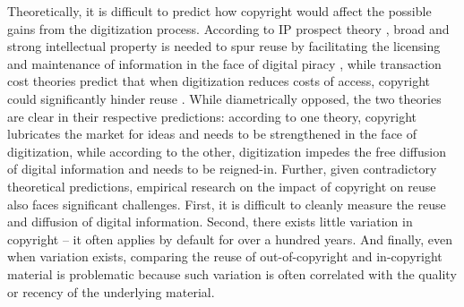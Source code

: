 \documentclass[11pt]{article}
\begin{document}
Theoretically, it is difficult to predict how copyright would affect the possible gains from the digitization process. According to IP prospect theory \citep{kitch_nature_1977}, broad and strong intellectual property is needed to spur reuse by facilitating the licensing and maintenance of information \citep{mazzoleni_economic_1998, gallini_intellectual_2002} in the face of digital piracy \citep{rob_piracy_2007}, while transaction cost theories predict that when digitization reduces costs of access, copyright could significantly hinder reuse \citep{lessig_free_2005, benkler_wealth_2006, zittrain_future_2009, lemley_ex_2004}. While diametrically opposed, the two theories are clear in their respective predictions: according  to  one  theory, copyright lubricates  the  market for ideas \citep{gans_product_2003} and needs to be strengthened in the face of digitization, while according to the other, digitization impedes the free diffusion of digital information and needs to be reigned-in. Further, given contradictory theoretical predictions, empirical research on the impact of copyright on reuse also faces significant challenges. First, it is difficult to cleanly measure the reuse and diffusion of digital information. Second, there exists little variation in copyright -- it often applies by default for over a hundred years. And finally, even when variation exists, comparing the reuse of out-of-copyright and in-copyright material is problematic because such variation is often correlated with the quality or recency of the underlying material. 
\end{document}
